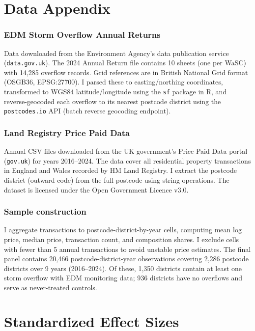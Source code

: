 \documentclass[12pt]{article}
\begin{document}
\label{apep_main_text_end}
\newpage


\newpage
\appendix

\section{Data Appendix}

\subsubsection*{EDM Storm Overflow Annual Returns} Data downloaded from the Environment Agency's data publication service (\texttt{data.gov.uk}). The 2024 Annual Return file contains 10 sheets (one per WaSC) with 14,285 overflow records. Grid references are in British National Grid format (OSGB36, EPSG:27700). I parsed these to easting/northing coordinates, transformed to WGS84 latitude/longitude using the \texttt{sf} package in R, and reverse-geocoded each overflow to its nearest postcode district using the \texttt{postcodes.io} API (batch reverse geocoding endpoint).

\subsubsection*{Land Registry Price Paid Data} Annual CSV files downloaded from the UK government's Price Paid Data portal (\texttt{gov.uk}) for years 2016--2024. The data cover all residential property transactions in England and Wales recorded by HM Land Registry. I extract the postcode district (outward code) from the full postcode using string operations. The dataset is licensed under the Open Government Licence v3.0.

\subsubsection*{Sample construction} I aggregate transactions to postcode-district-by-year cells, computing mean log price, median price, transaction count, and composition shares. I exclude cells with fewer than 5 annual transactions to avoid unstable price estimates. The final panel contains 20,466 postcode-district-year observations covering 2,286 postcode districts over 9 years (2016--2024). Of these, 1,350 districts contain at least one storm overflow with EDM monitoring data; 936 districts have no overflows and serve as never-treated controls.

\section{Standardized Effect Sizes}
\label{sec:sde}


\end{document}
